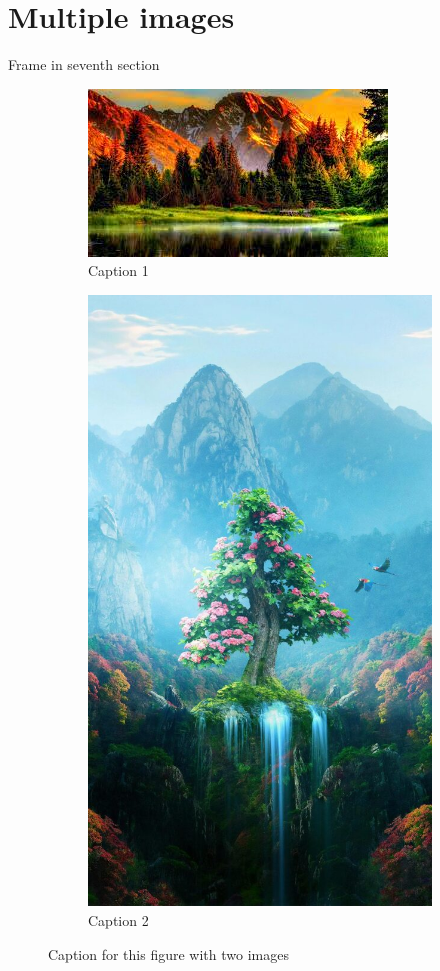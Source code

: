 \documentclass[xetex,aspectratio=169]{beamer}
\begin{document}
    \section{Multiple images}
    \begin{frame}{Frame in seventh section}
        \begin{figure}
            \centering
            \begin{subfigure}{0.45\textwidth}
                \includegraphics[width=.5\textwidth, keepaspectratio]{example_images/nature1.jpg} 
                \caption{Caption 1}
                \label{fig:subim1}
            \end{subfigure}
            \begin{subfigure}{0.45\textwidth}
                \includegraphics[width=.2\textwidth, keepaspectratio]{example_images/nature2-576x1024.jpg}
                \caption{Caption 2}
                \label{fig:subim2}
            \end{subfigure}
            
            \caption{Caption for this figure with two images}
            \label{fig:image2}
        \end{figure}
    \end{frame}
\end{document}
